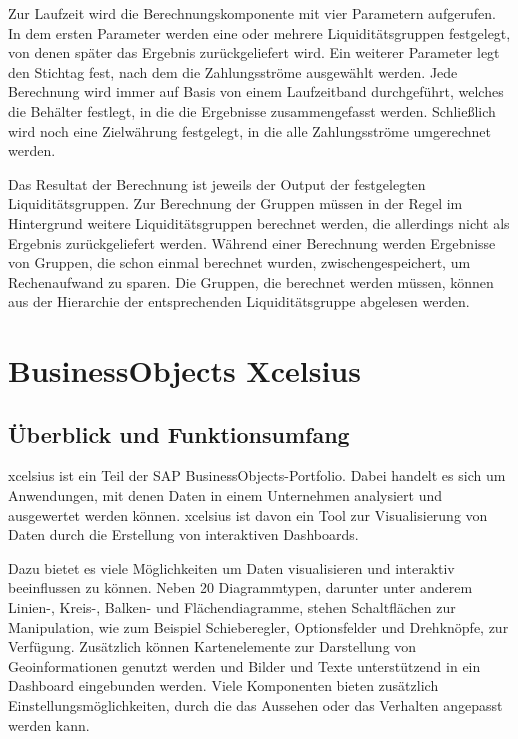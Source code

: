 \begin{onehalfspacing}
\label{sec:berechnungskomponente:parameter}
Zur Laufzeit wird die Berechnungskomponente mit vier Parametern aufgerufen. In dem ersten Parameter werden eine oder mehrere Liquiditätsgruppen festgelegt, von denen später das Ergebnis zurückgeliefert wird. Ein weiterer Parameter legt den Stichtag fest, nach dem die Zahlungsströme ausgewählt werden. Jede Berechnung wird immer auf Basis von einem Laufzeitband durchgeführt, welches die Behälter festlegt, in die die Ergebnisse zusammengefasst werden. Schließlich wird noch eine Zielwährung festgelegt, in die alle Zahlungsströme umgerechnet werden.

Das Resultat der Berechnung ist jeweils der Output der festgelegten Liquiditätsgruppen. Zur Berechnung der Gruppen müssen in der Regel im Hintergrund weitere Liquiditätsgruppen berechnet werden, die allerdings nicht als Ergebnis zurückgeliefert werden. Während einer Berechnung werden Ergebnisse von Gruppen, die schon einmal berechnet wurden, zwischengespeichert, um Rechenaufwand zu sparen. Die Gruppen, die berechnet werden müssen, können aus der Hierarchie der entsprechenden Liquiditätsgruppe abgelesen werden.

\section{BusinessObjects Xcelsius}
\label{sec:xcelsius}
\subsection{Überblick und Funktionsumfang} 
\gls{xcelsius} ist ein Teil der SAP BusinessObjects-Portfolio. Dabei handelt es sich um Anwendungen, mit denen Daten in einem Unternehmen analysiert und ausgewertet werden können. \gls{xcelsius} ist davon ein Tool zur Visualisierung von Daten durch die Erstellung von interaktiven Dashboards.

Dazu bietet es viele Möglichkeiten um Daten visualisieren und interaktiv beeinflussen zu können. Neben 20 Diagrammtypen, darunter unter anderem Linien-, Kreis-, Balken- und Flächendiagramme, stehen Schaltflächen zur Manipulation, wie zum Beispiel Schieberegler, Optionsfelder und Drehknöpfe, zur Verfügung. Zusätzlich können Kartenelemente zur Darstellung von Geoinformationen genutzt werden und Bilder und Texte unterstützend in ein Dashboard eingebunden werden. Viele Komponenten bieten zusätzlich Einstellungsmöglichkeiten, durch die das Aussehen oder das Verhalten angepasst werden kann.


\end{onehalfspacing}
